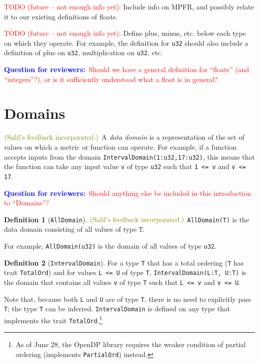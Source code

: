 \documentclass[11pt,a4paper]{article}
\theoremstyle{definition}
\newtheorem{definition}{Definition}[section]
\newcommand{\silvia}[1]{{ {\color{blue}{(silvia)~#1}}}}
\newcommand{\sfi}{\text{\textcolor{olive}{(Salil's feedback incorporated.)}}}
\newcommand{\questionr}[1]{\textcolor{blue}{\textbf{Question for reviewers:}}\textcolor{red}{~#1}}
\newcommand{\T}{\texttt{T}}
\newcommand{\todonei}{{\textcolor{red}{TODO (future -- not enough info yet): }}}
\begin{document}

\todonei{Include info on MPFR, and possibly relate it to our existing definitions of floats.}

\todonei{Define plus, minus, etc. below each type on which they operate. For example, the definition for \texttt{u32} should also include a definition of plus on \texttt{u32}, multiplication on \texttt{u32}, etc.}

\questionr{Should we have a general definition for ``floats'' (and ``integers''?), or is it sufficiently understood what a float is in general?}

\section{Domains}

$\sfi$ A \emph{data domain} is a representation of the set of values on which a metric or function can operate. For example, if a function accepts inputs from the domain \texttt{IntervalDomain(1:u32,17:u32)}, this means that the function can take any input value \texttt{v} of type \texttt{u32} such that \texttt{1 <= v} and \texttt{v <= 17}.

\questionr{Should anything else be included in this introduction to ``Domains''?}

\begin{definition}[\texttt{AllDomain}]$\sfi$
\texttt{AllDomain(T)} is the data domain consisting of all values of type $\T$. 
\end{definition}

For example, \texttt{AllDomain(u32)} is the domain of all values of type \texttt{u32}.

\begin{definition}[\texttt{IntervalDomain}] \sfi
For a type \texttt{T} that has a total ordering (\texttt{T} has trait \texttt{TotalOrd}) and for values \texttt{L <= U} of type \texttt{T}, \texttt{IntervalDomain(L:T, U:T)} is the domain that contains all values \texttt{v} of type \texttt{T} such that \texttt{L <= v} and \texttt{v <= U}.
    
Note that, because both \texttt{L} and \texttt{U} are of type \texttt{T}, there is no need to explicitly pass \texttt{T}; the type \texttt{T} can be inferred. \texttt{IntervalDomain} is defined on any type that implements the trait \texttt{TotalOrd}.\footnote{As of June 28, the OpenDP library requires the weaker condition of partial ordering (implements \texttt{PartialOrd}) instead.}
\end{definition}
\end{document}
